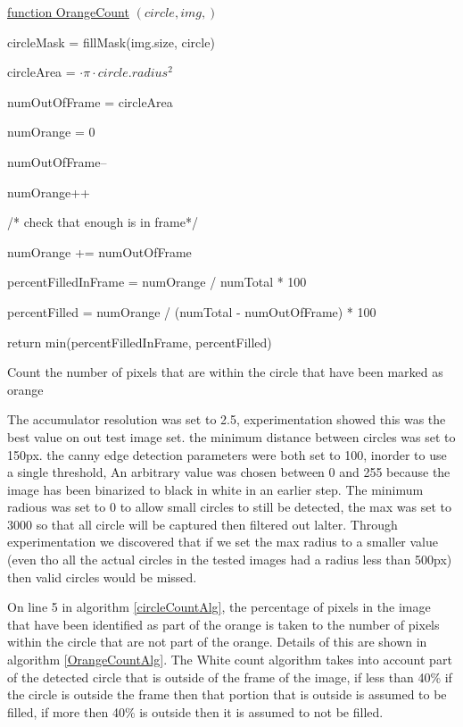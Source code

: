 \documentclass[conference]{IEEEtran}
\begin{document}
\begin{algorithm} 

    \underline{function OrangeCount} $(circle, img,)$\;
    
        
    circleMask = fillMask(img.size, circle)
    
    circleArea = $  \cdot \pi \cdot circle.radius^2$
    
    numOutOfFrame = circleArea
   
    numOrange = 0
    
    
    {
	 {
	 	numOutOfFrame--
		
		{
			numOrange++
		}
	 }
    }
    
    /* check that enough is in frame*/
    
     {
	numOrange += numOutOfFrame
    }
    
    percentFilledInFrame = numOrange / numTotal * 100
    
    percentFilled = numOrange / (numTotal - numOutOfFrame) * 100
    
    return min(percentFilledInFrame, percentFilled)
    
    
    \caption{Count the number of pixels that are within the circle that have been marked as orange} \label{OrangeCountAlg}
\end{algorithm}

The accumulator resolution was set to 2.5, experimentation showed this was the best value on out test image set. 
the minimum distance between circles was set to 150px.
the canny edge detection parameters were both set to 100, inorder to use a single threshold, An arbitrary value was chosen between 0 and 255 because the image has been binarized to black in white in an earlier step.
The minimum radious was set to 0 to allow small circles to still be detected, the max was set to 3000 so that all circle will be captured then filtered out lalter. Through experimentation we discovered that if we set the max radius to a smaller value (even tho all the actual circles in the tested images had a radius less than  500px) then valid circles would be missed.


On line 5 in algorithm \ref{circleCountAlg}, the percentage of pixels in the image that have been identified as part of the orange is taken to the number of pixels within the circle that are not part of the orange. Details of this are shown in algorithm \ref{OrangeCountAlg}. The White count algorithm takes into account part of the detected circle that is outside of the frame of the image, if less than 40\% if the circle is outside the frame then that portion that is outside is assumed to be filled, if more then 40\% is outside then it is assumed to not be filled. 
\end{document}
